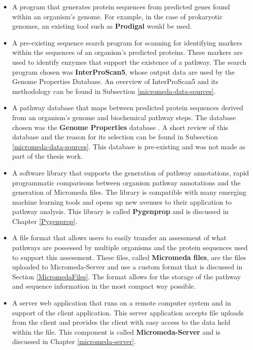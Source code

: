 \begin{itemize}
\item A program that generates protein sequences from predicted genes found 
within an organism's genome. For example, in the case of prokaryotic genomes, an 
existing tool such as \textbf{Prodigal} \cite{hyatt2010prodigal} would be used. 

\item A pre-existing sequence search program for scanning for identifying 
markers within the sequences of an organism's predicted proteins. These markers 
are used to identify enzymes that support the existence of a pathway. The search 
program chosen was \textbf{InterProScan5}, whose output data are used by the 
Genome Properties Database. An overview of InterProScan5 
\cite{jones2014interproscan} and its methodology can be found in Subsection 
\ref{micromeda-data-sources}.

\item A pathway database that maps between predicted protein sequences derived 
from an organism's genome and biochemical pathway steps. The database chosen was 
the \textbf{Genome Properties} database \cite{richardson2018genome}. A short 
review of this database and the reason for its selection can be found in 
Subsection \ref{micromeda-data-sources}. This database is pre-existing 
and was not made as part of the thesis work.

\item A software library that supports the generation of pathway annotations, 
rapid programmatic comparisons between organism pathway annotations and the 
generation of Micromeda files. The library is compatible with many 
emerging machine learning tools and opens up new avenues to their application to 
pathway analysis. This library is called \textbf{Pygenprop} and is discussed in 
Chapter \ref{Pygenprop}.

\item A file format that allows users to easily transfer an assessment of what 
pathways are possessed by multiple organisms and the protein sequences used to 
support this assessment. These files, called \textbf{Micromeda files}, are the 
files uploaded to Micromeda-Server and use a custom format that is discussed in 
Section \ref{MicromedaFiles}. The format allows for the storage of the pathway 
and sequence information in the most compact way possible.

\item A server web application that runs on a remote computer system and in 
support of the client application. This server application accepts file uploads 
from the client and provides the client with easy access to the data held within 
the file. This component is called \textbf{Micromeda-Server} and is discussed in 
Chapter \ref{micromeda-server}.


\end{itemize}
